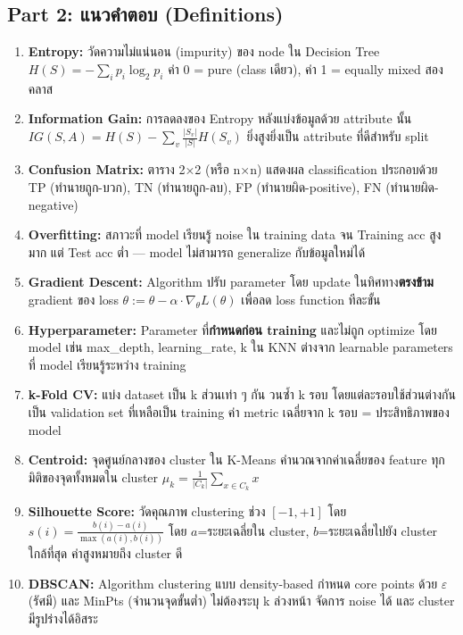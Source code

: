 \documentclass[a4paper,12pt]{article}
\begin{document}
\subsection*{Part 2: แนวคำตอบ (Definitions)}

\begin{enumerate}[label=\textbf{\arabic*.}]
    \item \textbf{Entropy:} วัดความไม่แน่นอน (impurity) ของ node ใน Decision Tree $H(S) = -\sum_{i} p_i \log_2 p_i$ ค่า 0 = pure (class เดียว), ค่า 1 = equally mixed สองคลาส
    \item \textbf{Information Gain:} การลดลงของ Entropy หลังแบ่งข้อมูลด้วย attribute นั้น $IG(S,A) = H(S) - \sum_v \frac{|S_v|}{|S|}H(S_v)$ ยิ่งสูงยิ่งเป็น attribute ที่ดีสำหรับ split
    \item \textbf{Confusion Matrix:} ตาราง 2×2 (หรือ n×n) แสดงผล classification ประกอบด้วย TP (ทำนายถูก-บวก), TN (ทำนายถูก-ลบ), FP (ทำนายผิด-positive), FN (ทำนายผิด-negative)
    \item \textbf{Overfitting:} สภาวะที่ model เรียนรู้ noise ใน training data จน Training acc สูงมาก แต่ Test acc ต่ำ --- model ไม่สามารถ generalize กับข้อมูลใหม่ได้
    \item \textbf{Gradient Descent:} Algorithm ปรับ parameter โดย update ในทิศทาง\textbf{ตรงข้าม} gradient ของ loss $\theta := \theta - \alpha \cdot \nabla_\theta L(\theta)$ เพื่อลด loss function ทีละขั้น
    \item \textbf{Hyperparameter:} Parameter ที่\textbf{กำหนดก่อน training} และไม่ถูก optimize โดย model เช่น max\_depth, learning\_rate, k ใน KNN ต่างจาก learnable parameters ที่ model เรียนรู้ระหว่าง training
    \item \textbf{k-Fold CV:} แบ่ง dataset เป็น k ส่วนเท่า ๆ กัน วนซ้ำ k รอบ โดยแต่ละรอบใช้ส่วนต่างกันเป็น validation set ที่เหลือเป็น training ค่า metric เฉลี่ยจาก k รอบ = ประสิทธิภาพของ model
    \item \textbf{Centroid:} จุดศูนย์กลางของ cluster ใน K-Means คำนวณจากค่าเฉลี่ยของ feature ทุกมิติของจุดทั้งหมดใน cluster $\mu_k = \frac{1}{|C_k|}\sum_{x \in C_k} x$
    \item \textbf{Silhouette Score:} วัดคุณภาพ clustering ช่วง $[-1, +1]$ โดย $s(i) = \frac{b(i)-a(i)}{\max(a(i),b(i))}$ โดย $a$=ระยะเฉลี่ยใน cluster, $b$=ระยะเฉลี่ยไปยัง cluster ใกล้ที่สุด ค่าสูงหมายถึง cluster ดี
    \item \textbf{DBSCAN:} Algorithm clustering แบบ density-based กำหนด core points ด้วย $\varepsilon$ (รัศมี) และ MinPts (จำนวนจุดขั้นต่ำ) ไม่ต้องระบุ k ล่วงหน้า จัดการ noise ได้ และ cluster มีรูปร่างได้อิสระ
\end{enumerate}
\end{document}
